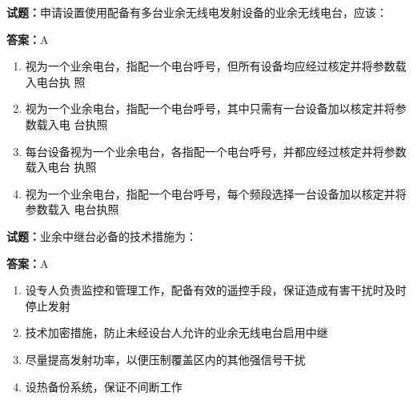 \documentclass{ctexbook}
\begin{document}




\vspace{1em}

\textbf{试题：}申请设置使用配备有多台业余无线电发射设备的业余无线电台，应该： 

\textbf{答案：}A 

\begin{enumerate}[leftmargin=3em]
  \item 视为一个业余电台，指配一个电台呼号，但所有设备均应经过核定并将参数载入电台执
照 

  \item 视为一个业余电台，指配一个电台呼号，其中只需有一台设备加以核定并将参数载入电
台执照 

  \item 每台设备视为一个业余电台，各指配一个电台呼号，并都应经过核定并将参数载入电台
执照 

  \item 视为一个业余电台，指配一个电台呼号，每个频段选择一台设备加以核定并将参数载入
电台执照 

\end{enumerate}





\vspace{1em}

\textbf{试题：}业余中继台必备的技术措施为： 

\textbf{答案：}A 

\begin{enumerate}[leftmargin=3em]
  \item 设专人负责监控和管理工作，配备有效的遥控手段，保证造成有害干扰时及时停止发射 

  \item 技术加密措施，防止未经设台人允许的业余无线电台启用中继 

  \item 尽量提高发射功率，以便压制覆盖区内的其他强信号干扰 

  \item 设热备份系统，保证不间断工作 

\end{enumerate}



\end{document}

